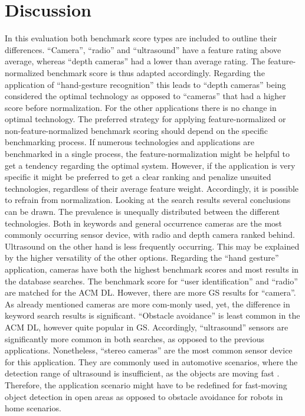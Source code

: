 \section{Discussion}
In this evaluation both benchmark score types are included to outline their differences. “Camera”, “radio” and “ultrasound” have a feature rating above average, whereas “depth cameras” had a lower than average rating. The feature-normalized benchmark score is thus adapted accordingly. Regarding the application of “hand-gesture recognition” this leads to “depth cameras” being considered the optimal technology as opposed to “cameras” that had a higher score before normalization. For the other applications there is no change in optimal technology. The preferred strategy for applying feature-normalized or non-feature-normalized benchmark scoring should depend on the specific benchmarking process. If numerous technologies and applications are benchmarked in a single process, the feature-normalization might be helpful to get a tendency regarding the optimal system. However, if the application is very specific it might be preferred to get a clear ranking and penalize unsuited technologies, regardless of their average feature weight. Accordingly, it is possible to refrain from normalization.
Looking at the search results several conclusions can be drawn. The prevalence is unequally distributed between the different technologies. Both in keywords and general occurrence cameras are the most commonly occurring sensor device, with radio and depth camera ranked behind. Ultrasound on the other hand is less frequently occurring. This may be explained by the higher versatility of the other options. Regarding the “hand gesture” application, cameras have both the highest benchmark scores and most results in the database searches. The benchmark score for “user identification” and “radio” are matched for the ACM DL. However, there are more GS results for “camera”. As already mentioned cameras are more com-monly used, yet, the difference in keyword search results is significant. “Obstacle avoidance” is least common in the ACM DL, however quite popular in GS. Accordingly, “ultrasound” sensors are significantly more common in both searches, as opposed to the previous applications. Nonetheless, “stereo cameras” are the most common sensor device for this application. They are commonly used in automotive scenarios, where the detection range of ultrasound is insufficient, as the objects are moving fast \cite{bertozzi1998gold}. Therefore, the application scenario might have to be redefined for fast-moving object detection in open areas as opposed to obstacle avoidance for robots in home scenarios. 
